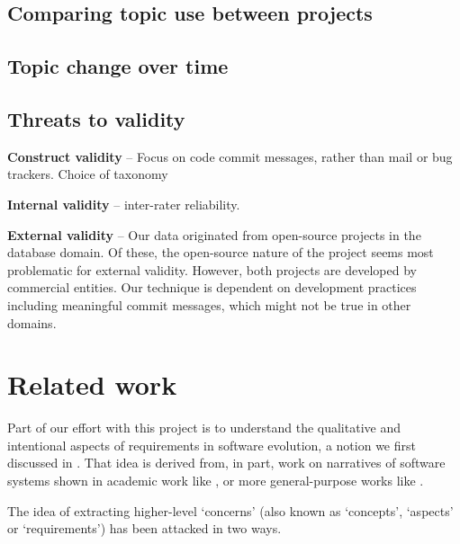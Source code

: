 \documentclass[10pt, conference, compsocconf]{IEEEtran}
\begin{document}
\subsection{Comparing topic use between projects}

\subsection{Topic change over time}

\subsection{Threats to validity}
\textbf{Construct validity} – Focus on code commit messages, rather than mail or bug trackers. Choice of taxonomy

\textbf{Internal validity} -- inter-rater reliability.

\textbf{External validity} – Our data originated from open-source projects in the database domain. Of these, the open-source nature of the project seems most problematic for external validity. However, both projects are developed by commercial entities. Our technique is dependent on development practices including meaningful commit messages, which might not be true in other domains.

\section{Related work}
Part of our effort with this project is to understand the qualitative and intentional aspects of requirements in software evolution, a notion we first discussed in \cite{ernst07icsm}. That idea is derived from, in part, work on narratives of software systems shown in academic work like \cite{anton01}, or more general-purpose works like \cite{waldo93}.

The idea of extracting higher-level `concerns' (also known as `concepts', `aspects' or `requirements') has been attacked in two ways.
\end{document}
